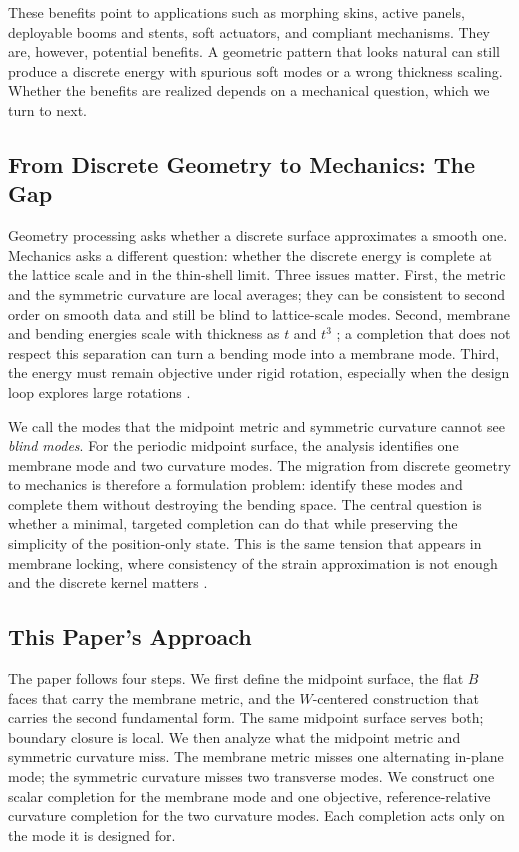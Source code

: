 These benefits point to applications such as morphing skins, active panels,
deployable booms and stents, soft actuators, and compliant mechanisms. They are,
however, potential benefits. A geometric pattern that looks natural can still
produce a discrete energy with spurious soft modes or a wrong thickness scaling.
Whether the benefits are realized depends on a mechanical question, which we
turn to next.

\subsection{From Discrete Geometry to Mechanics: The Gap}
\label{sec:intro-gap}

Geometry processing asks whether a discrete surface approximates a smooth one.
Mechanics asks a different question: whether the discrete energy is complete at
the lattice scale and in the thin-shell limit. Three issues matter. First, the
metric and the symmetric curvature are local averages; they can be consistent
to second order on smooth data and still be blind to lattice-scale modes.
Second, membrane and bending energies scale with thickness as $t$ and $t^3$
\cite{koiter1966,ciarlet2005}; a completion that does not respect this
separation can turn a bending mode into a membrane mode. Third, the energy
must remain objective under rigid rotation, especially when the design loop
explores large rotations \cite{simoFox1989}.

We call the modes that the midpoint metric and symmetric curvature cannot see
\emph{blind modes}. For the periodic midpoint surface, the analysis identifies
one membrane mode and two curvature modes. The migration from discrete geometry
to mechanics is therefore a formulation problem: identify these modes and
complete them without destroying the bending space. The central question is whether a minimal, targeted completion can do
that while preserving the simplicity of the position-only state. This is the
same tension that appears in membrane locking, where consistency of the strain
approximation is not enough and the discrete kernel matters
\cite{chapelleBathe2011,arnoldBrezzi1997,hiemstraEtAl2023}.

\subsection{This Paper's Approach}
\label{sec:intro-approach}

The paper follows four steps. We first define the midpoint surface, the flat
$B$ faces that carry the membrane metric, and the $W$-centered construction that
carries the second fundamental form. The same midpoint surface serves both;
boundary closure is local. We then analyze what the midpoint metric and
symmetric curvature miss. The membrane metric misses one alternating in-plane
mode; the symmetric curvature misses two transverse modes. We construct one
scalar completion for the membrane mode and one objective, reference-relative
curvature completion for the two curvature modes. Each completion acts only on
the mode it is designed for.

